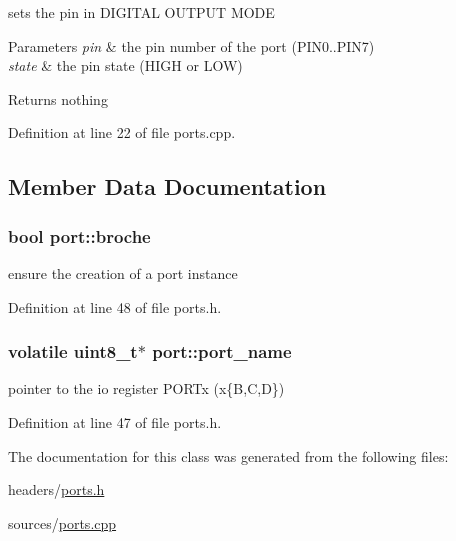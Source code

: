 sets the pin in D\-I\-G\-I\-T\-A\-L O\-U\-T\-P\-U\-T M\-O\-D\-E 


\begin{DoxyParams}{Parameters}
{\em pin} & the pin number of the port (P\-I\-N0..P\-I\-N7) \\
\hline
{\em state} & the pin state (H\-I\-G\-H or L\-O\-W) \\
\hline
\end{DoxyParams}
\begin{DoxyReturn}{Returns}
nothing 
\end{DoxyReturn}


Definition at line 22 of file ports.\-cpp.



\subsection{Member Data Documentation}
\hypertarget{classport_a296e1dfa3d9c7e5b8fa707355a523f6c}{
\subsubsection[{broche}]{\setlength{\rightskip}{0pt plus 5cm}bool port\-::broche\hspace{0.3cm}{\ttfamily [protected]}}}\label{classport_a296e1dfa3d9c7e5b8fa707355a523f6c}


ensure the creation of a port instance 



Definition at line 48 of file ports.\-h.

\hypertarget{classport_a7d360768f8ba1c3f2c65c0c72bafaf54}{
\subsubsection[{port\-\_\-name}]{\setlength{\rightskip}{0pt plus 5cm}volatile uint8\-\_\-t$\ast$ port\-::port\-\_\-name\hspace{0.3cm}{\ttfamily [protected]}}}\label{classport_a7d360768f8ba1c3f2c65c0c72bafaf54}


pointer to the io register P\-O\-R\-Tx (x\{B,C,D\}) 



Definition at line 47 of file ports.\-h.



The documentation for this class was generated from the following files\-:\begin{DoxyCompactItemize}
\item 
headers/\hyperlink{ports_8h}{ports.\-h}\item 
sources/\hyperlink{ports_8cpp}{ports.\-cpp}\end{DoxyCompactItemize}
